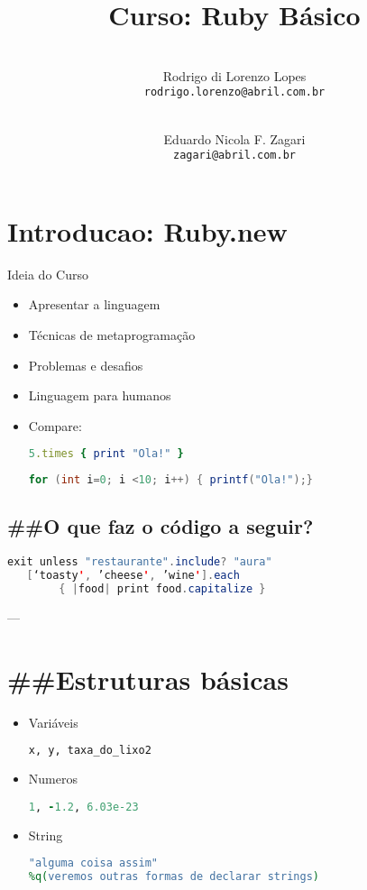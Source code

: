 \documentclass[serif,mathserif]{article}
\author{ 
    \\ Rodrigo di Lorenzo Lopes \\  \texttt{rodrigo.lorenzo@abril.com.br}
	\and 
    \\ Eduardo Nicola F. Zagari \\ \texttt{zagari@abril.com.br}
}
\title{Curso: Ruby Básico}
\begin{document}
\maketitle
 
\tableofcontents

\section{Introducao: Ruby.new}

Ideia do Curso
\begin{itemize}
  \item Apresentar a linguagem
  \item Técnicas de metaprogramação
  \item Problemas e desafios
\end{itemize}


\begin{itemize}
\item Linguagem para humanos
\item Compare:
\begin{lstlisting}[language=ruby]
5.times { print "Ola!" }
\end{lstlisting}

\begin{lstlisting}[language=java]
for (int i=0; i <10; i++) { printf("Ola!");}
\end{lstlisting}

\end{itemize}

\subsection{\#\#O que faz o código a seguir?}
\begin{lstlisting}[language=java]
   exit unless "restaurante".include? "aura"
   [‘toasty', ’cheese', ’wine'].each 
        { |food| print food.capitalize }
\end{lstlisting}

---


\section{\#\#Estruturas básicas}

\begin{itemize}
  \item Variáveis 
\begin{lstlisting}[language=ruby]
x, y, taxa_do_lixo2
\end{lstlisting} 
   \item{Numeros}
\begin{lstlisting}[language=ruby]
1, -1.2, 6.03e-23    
\end{lstlisting}
	\item {String}
\begin{lstlisting}[language=ruby]
"alguma coisa assim"
%q(veremos outras formas de declarar strings)
\end{lstlisting}
 
\end{itemize}
\end{document}
